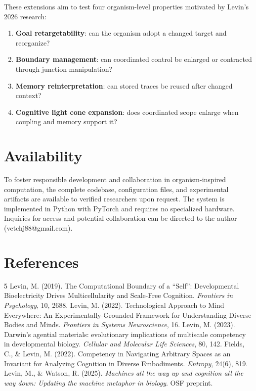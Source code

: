 \documentclass[11pt,a4paper]{article}
\begin{document}
These extensions aim to test four organism-level properties motivated by Levin's 2026 research:
\begin{enumerate}[leftmargin=*,itemsep=3pt]
\item \textbf{Goal retargetability}: can the organism adopt a changed target and reorganize?
\item \textbf{Boundary management}: can coordinated control be enlarged or contracted through junction manipulation?
\item \textbf{Memory reinterpretation}: can stored traces be reused after changed context?
\item \textbf{Cognitive light cone expansion}: does coordinated scope enlarge when coupling and memory support it?
\end{enumerate}

\section{Availability}
To foster responsible development and collaboration in organism-inspired computation, the complete codebase, configuration files, and experimental artifacts are available to verified researchers upon request. The system is implemented in Python with PyTorch and requires no specialized hardware. Inquiries for access and potential collaboration can be directed to the author (vetchj88@gmail.com).

\section{References}
\begin{thebibliography}{5}
 Levin, M. (2019). The Computational Boundary of a ``Self'': Developmental Bioelectricity Drives Multicellularity and Scale-Free Cognition. \emph{Frontiers in Psychology}, 10, 2688.
 Levin, M. (2022). Technological Approach to Mind Everywhere: An Experimentally-Grounded Framework for Understanding Diverse Bodies and Minds. \emph{Frontiers in Systems Neuroscience}, 16.
 Levin, M. (2023). Darwin's agential materials: evolutionary implications of multiscale competency in developmental biology. \emph{Cellular and Molecular Life Sciences}, 80, 142.
 Fields, C., \& Levin, M. (2022). Competency in Navigating Arbitrary Spaces as an Invariant for Analyzing Cognition in Diverse Embodiments. \emph{Entropy}, 24(6), 819.
 Levin, M., \& Watson, R. (2025). \emph{Machines all the way up and cognition all the way down: Updating the machine metaphor in biology}. OSF preprint.
\end{thebibliography}
\end{document}
